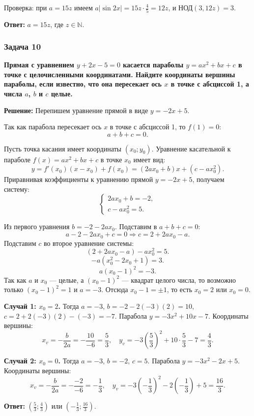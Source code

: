\documentclass[12pt, a4paper]{article}
\begin{document}
Проверка: при $a = 15z$ имеем $a|\sin 2x| = 15z \cdot \frac{4}{5} = 12z$, и НОД$(3, 12z) = 3$.

\textbf{Ответ:} $a = 15z$, где $z \in \mathbb{N}$.

\subsubsection*{Задача 10}
\textbf{Прямая с уравнением $y + 2x - 5 = 0$ касается параболы $y = ax^2 + bx + c$ в точке с целочисленными координатами. Найдите координаты вершины параболы, если известно, что она пересекает ось $x$ в точке с абсциссой 1, а числа $a$, $b$ и $c$ целые.}

\textbf{Решение:}
Перепишем уравнение прямой в виде $y = -2x + 5$.

Так как парабола пересекает ось $x$ в точке с абсциссой 1, то $f(1) = 0$:
\[
a + b + c = 0.
\]

Пусть точка касания имеет координаты $(x_0; y_0)$. Уравнение касательной к параболе $f(x) = ax^2 + bx + c$ в точке $x_0$ имеет вид:
\[
y = f'(x_0)(x - x_0) + f(x_0) = (2ax_0 + b)x + (c - ax_0^2).
\]
Приравнивая коэффициенты к уравнению прямой $y = -2x + 5$, получаем систему:
\[
\begin{cases}
2ax_0 + b = -2, \\
c - ax_0^2 = 5.
\end{cases}
\]

Из первого уравнения $b = -2 - 2ax_0$. Подставим в $a + b + c = 0$:
\[
a - 2 - 2ax_0 + c = 0 \Rightarrow c = 2 + 2ax_0 - a.
\]
Подставим $c$ во второе уравнение системы:
\[
(2 + 2ax_0 - a) - ax_0^2 = 5.
\]
\[
-a(x_0^2 - 2x_0 + 1) = 3.
\]
\[
a(x_0 - 1)^2 = -3.
\]
Так как $a$ и $x_0$ — целые, а $(x_0 - 1)^2$ — квадрат целого числа, то возможно только $(x_0 - 1)^2 = 1$ и $a = -3$. Отсюда $x_0 - 1 = \pm 1$, то есть $x_0 = 2$ или $x_0 = 0$.

\textbf{Случай 1: $x_0 = 2$.} Тогда $a = -3$, $b = -2 - 2(-3)(2) = 10$, $c = 2 + 2(-3)(2) - (-3) = -7$. Парабола $y = -3x^2 + 10x - 7$. Координаты вершины:
\[
x_v = -\frac{b}{2a} = -\frac{10}{-6} = \frac{5}{3}, \quad y_v = -3\left(\frac{5}{3}\right)^2 + 10 \cdot \frac{5}{3} - 7 = \frac{4}{3}.
\]

\textbf{Случай 2: $x_0 = 0$.} Тогда $a = -3$, $b = -2$, $c = 5$. Парабола $y = -3x^2 - 2x + 5$. Координаты вершины:
\[
x_v = -\frac{b}{2a} = -\frac{-2}{-6} = -\frac{1}{3}, \quad y_v = -3\left(-\frac{1}{3}\right)^2 - 2\left(-\frac{1}{3}\right) + 5 = \frac{16}{3}.
\]

\textbf{Ответ:} $\left(\frac{5}{3}; \frac{4}{3}\right)$ или $\left(-\frac{1}{3}; \frac{16}{3}\right)$.
\end{document}
